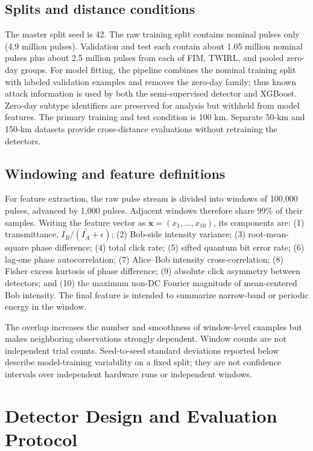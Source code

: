 \documentclass[12pt, a4paper]{report}
\begin{document}
\section{Splits and distance conditions}
The master split seed is 42. The raw training split contains nominal pulses only (4.9 million pulses). Validation and test each contain about 1.05 million nominal pulses plus about 2.5 million pulses from each of FIM, TWIRL, and pooled zero-day groups. For model fitting, the pipeline combines the nominal training split with labeled validation examples and removes the zero-day family; thus known attack information is used by both the semi-supervised detector and XGBoost. Zero-day subtype identifiers are preserved for analysis but withheld from model features. The primary training and test condition is 100 km. Separate 50-km and 150-km datasets provide cross-distance evaluations without retraining the detectors.

\section{Windowing and feature definitions}
For feature extraction, the raw pulse stream is divided into windows of 100,000 pulses, advanced by 1,000 pulses. Adjacent windows therefore share 99\% of their samples. Writing the feature vector as $\mathbf{x}=(x_1,\ldots,x_{10})$, its components are: (1) transmittance, $\overline{I_B}/(\overline{I_A}+\epsilon)$; (2) Bob-side intensity variance; (3) root-mean-square phase difference; (4) total click rate; (5) sifted quantum bit error rate; (6) lag-one phase autocorrelation; (7) Alice--Bob intensity cross-correlation; (8) Fisher excess kurtosis of phase difference; (9) absolute click asymmetry between detectors; and (10) the maximum non-DC Fourier magnitude of mean-centered Bob intensity. The final feature is intended to summarize narrow-band or periodic energy in the window.

The overlap increases the number and smoothness of window-level examples but makes neighboring observations strongly dependent. Window counts are not independent trial counts. Seed-to-seed standard deviations reported below describe model-training variability on a fixed split; they are not confidence intervals over independent hardware runs or independent windows.

\chapter{Detector Design and Evaluation Protocol}
\end{document}
